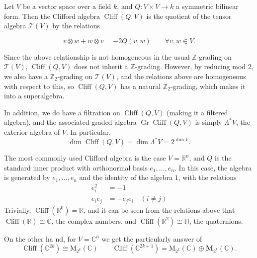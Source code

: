 \documentclass[12pt]{article}
\newcommand{\Cliff}{\operatorname{Cliff}}
\newcommand{\mc}[1]{\mathcal{#1}}
\newcommand{\R}{\mathbb{R}}
\newcommand{\C}{\mathbb{C}}
\newcommand{\Z}{\mathbb{Z}}
\newcommand{\Gr}{\operatorname{Gr}}
\begin{document}
Let $V$ be a vector space over a field $k$, and $Q:V\times V\to k$ a
symmetric bilinear form.  Then the Clifford algebra $\Cliff(Q,V)$ is
the quotient of the tensor algebra $\mc{T}(V)$ by the relations

$$v\otimes w+w\otimes v=-2Q(v,w)\qquad \forall v,w\in V.$$

Since the above relationship is not homogeneous in the usual
$\Z$-grading on $\mc{T}(V)$, $\Cliff(Q,V)$ does not inherit a
$\Z$-grading.  However, by reducing mod 2, we also have a
$\Z_2$-grading on $\mc{T}(V)$, and the relations above are homogeneous
with respect to this, so $\Cliff(Q,V)$ has a natural $\Z_2$-grading,
which makes it into a superalgebra.

In addition, we do have a filtration on $\Cliff(Q,V)$ (making it a
filtered algebra), and the associated graded algebra $\Gr\Cliff(Q,V)$
is simply $\Lambda^*V$, the exterior algebra of $V$.  In
particular, $$\dim\Cliff(Q,V)=\dim\Lambda^*V=2^{\dim V}.$$

The most commonly used Clifford algebra is the case $V=\R^n$, and $Q$
is the standard inner product with orthonormal basis $e_1,\ldots,e_n$.
In this case, the algebra is generated by $e_1,\ldots,e_n$ and the
identity of the algebra $1$, with the relations
\begin{align*}
e_i^2&=-1\\
e_ie_j&=-e_je_i \quad (i\neq j)
\end{align*}
Trivially, $\Cliff(\R^0)=\R$, and it can be seen from the relations
above that $\Cliff(\R)\cong\C$, the complex numbers, and
$\Cliff(\R^2)\cong\mathbb{H}$, the quaternions.

On the other ha
nd, for $V=\C^n$ we get the particularly  answer of
$$\Cliff(\C^{2k}) \cong \mathrm{M}_{2^k}(\C) \qquad \Cliff(\C^{2k+1})
= \mathrm{M}_{2^k}(\C) \oplus \mathbf{M}_{2^k}(\C).$$
\end{document}
